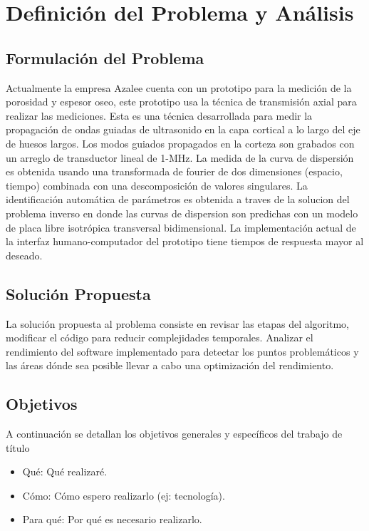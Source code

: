 

\chapter{Definición del Problema y Análisis}

\section{Formulación del Problema}

Actualmente la empresa Azalee cuenta con un prototipo para la medición de la
porosidad y espesor oseo,
este prototipo usa la técnica de transmisión axial para realizar las mediciones.
Esta es una técnica desarrollada para medir la propagación de ondas guiadas de
ultrasonido en la capa cortical a lo largo del eje de huesos largos.
Los modos guiados propagados en la corteza son grabados con un arreglo de
transductor lineal de 1-MHz.
La medida de la curva de dispersión es obtenida usando una transformada de
fourier de dos dimensiones (espacio, tiempo) combinada con una descomposición
de valores singulares.
La identificación automática de parámetros es obtenida a traves de la solucion
del problema inverso en donde las curvas de dispersion son predichas con un
modelo de placa libre isotrópica transversal bidimensional.
La implementación actual de la interfaz humano-computador del prototipo tiene
tiempos de respuesta mayor al deseado.

\section{Solución Propuesta}

La solución propuesta al problema consiste en revisar las etapas del algoritmo,
modificar el código para reducir complejidades temporales.
Analizar el rendimiento del software implementado para detectar los puntos
problemáticos y las áreas dónde sea posible llevar a cabo una optimización
del rendimiento.

\section{Objetivos}
A continuación se detallan los objetivos generales y específicos del trabajo de título
\begin{itemize}
    \item Qué: Qué realizaré.
    \item Cómo: Cómo espero realizarlo (ej: tecnología).
    \item Para qué: Por qué es necesario realizarlo.
\end{itemize}

